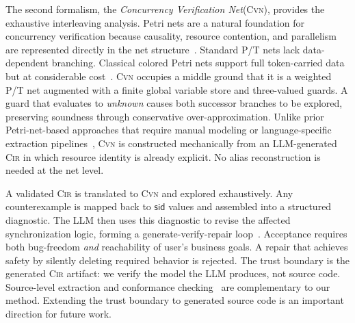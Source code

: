 \documentclass{article}
\begin{document}
The second formalism, the \emph{Concurrency Verification Net}(\textsc{Cvn}), provides the exhaustive interleaving analysis. Petri nets are a natural foundation for concurrency verification because causality, resource contention, and parallelism are represented directly in the net structure~\cite{Murata1989PetriNets,Esparza2008Unfoldings}. Standard P/T nets lack data-dependent branching. Classical colored Petri nets support full token-carried data but at considerable cost~\cite{Jensen2007CPNTools}. \textsc{Cvn} occupies a middle ground that it is a weighted P/T net augmented with a finite global variable store and three-valued guards. A guard that evaluates to \emph{unknown} causes both successor branches to be explored, preserving soundness through conservative over-approximation. Unlike prior Petri-net-based approaches that require manual modeling or language-specific extraction pipelines~\cite{Ball2002SLAM,Henzinger2003BLAST,Beyer2011CPAchecker}, \textsc{Cvn} is constructed mechanically from an LLM-generated \textsc{Cir} in which resource identity is already explicit. No alias reconstruction is needed at the net level.

A validated \textsc{Cir} is translated to \textsc{Cvn} and explored exhaustively. Any counterexample is mapped back to $\mathsf{sid}$ values and assembled into a structured diagnostic.  The LLM then uses this diagnostic to revise the affected synchronization logic, forming a generate-verify-repair loop~\cite{Clarke2000CEGAR,Bouzenia2025RepairAgent}. Acceptance requires both bug-freedom \emph{and} reachability of user's business goals. A repair that achieves safety by silently deleting required behavior is rejected. The trust boundary is the generated \textsc{Cir} artifact: we verify the model the LLM produces, not source code. Source-level extraction and conformance checking~\cite{Necula2000TranslationValidation, zhang2025petrinetsbasedmethodsautomatically} are complementary to our method. Extending the trust boundary to generated source code is an important direction for future work.
\end{document}
